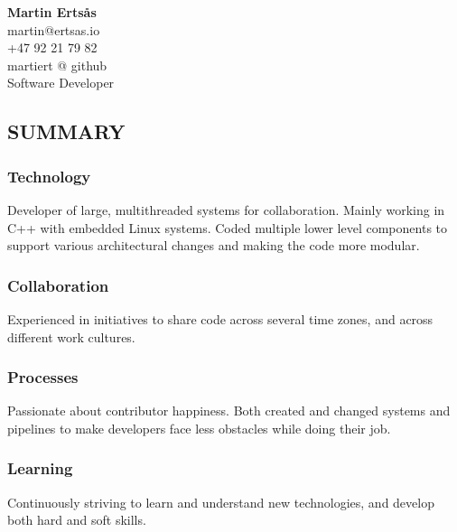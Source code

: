 \documentclass{article}
\begin{document}
\begin{center}

{\large\bf Martin Erts\aa s}\\
\bigskip
martin@ertsas.io\\
+47 92 21 79 82\\
martiert @ github\\
Software Developer\\
\end{center}

\subsection*{SUMMARY}

\begin{multicols}{2}

  \begin{addmargin}[2em]{0em}
    \subsubsection*{Technology}

    \begin{addmargin}[1em]{0em}
      Developer of large, multithreaded systems for collaboration. Mainly working in C++
      with embedded Linux systems. Coded multiple lower level components to support various
      architectural changes and making the code more modular.
    \end{addmargin}

    \subsubsection*{Collaboration}

    \begin{addmargin}[1em]{0em}
      Experienced in initiatives to share code across several time zones, and across
      different work cultures.
    \end{addmargin}

    \subsubsection*{Processes}

    \begin{addmargin}[1em]{0em}
      Passionate about contributor happiness. Both created and changed systems and pipelines
      to make developers face less obstacles while doing their job.
    \end{addmargin}

    \subsubsection*{Learning}

    \begin{addmargin}[1em]{0em}
      Continuously striving to learn and understand new technologies, and develop both hard
      and soft skills.
    \end{addmargin}

  \end{addmargin}

\end{multicols}
\end{document}

